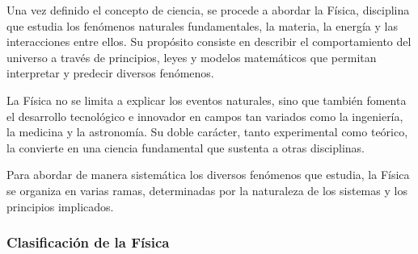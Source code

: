 Una vez definido el concepto de ciencia, se procede a abordar la Física, disciplina que estudia los fenómenos naturales fundamentales, la materia, la energía y las interacciones entre ellos. Su propósito consiste en describir el comportamiento del universo a través de principios, leyes y modelos matemáticos que permitan interpretar y predecir diversos fenómenos.

La Física no se limita a explicar los eventos naturales, sino que también fomenta el desarrollo tecnológico e innovador en campos tan variados como la ingeniería, la medicina y la astronomía. Su doble carácter, tanto experimental como teórico, la convierte en una ciencia fundamental que sustenta a otras disciplinas.

Para abordar de manera sistemática los diversos fenómenos que estudia, la Física se organiza en varias ramas, determinadas por la naturaleza de los sistemas y los principios implicados.

\subsubsection{Clasificación de la Física}

